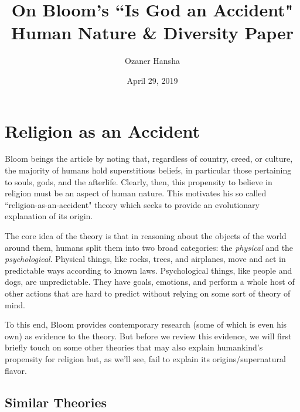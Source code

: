 \documentclass{article}
\begin{document}
\title{%
  On Bloom's ``Is God an Accident" \\
  \large Human Nature \& Diversity Paper}
\author{Ozaner Hansha}
\date{April 29, 2019}
\maketitle


\section{Religion as an Accident}
Bloom beings the article by noting that, regardless of country, creed, or culture, the majority of humans hold superstitious beliefs, in particular those pertaining to souls, gods, and the afterlife. Clearly, then, this propensity to believe in religion must be an aspect of human nature. This motivates his so called ``religion-as-an-accident" theory which seeks to provide an evolutionary explanation of its origin.

The core idea of the theory is that in reasoning about the objects of the world around them, humans split them into two broad categories: the \emph{physical} and the \emph{psychological}. Physical things, like rocks, trees, and airplanes, move and act in predictable ways according to known laws. Psychological things, like people and dogs, are unpredictable. They have goals, emotions, and perform a whole host of other actions that are hard to predict without relying on some sort of theory of mind.

To this end, Bloom provides contemporary research (some of which is even his own) as evidence to the theory. But before we review this evidence, we will first briefly touch on some other theories that may also explain humankind's propensity for religion but, as we'll see, fail to explain its origins/supernatural flavor.

\subsection{Similar Theories}
\end{document}
